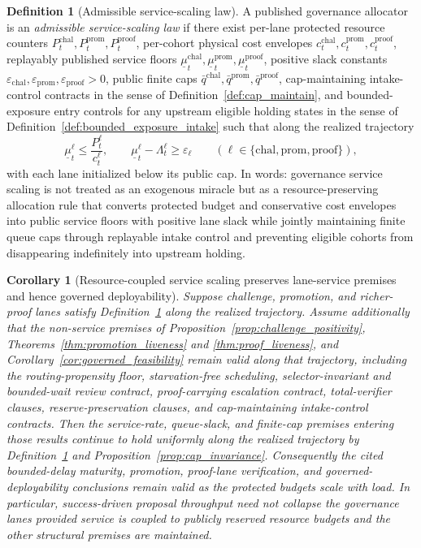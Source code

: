 \documentclass[11pt]{article}
\newtheorem{corollary}[theorem]{Corollary}
\theoremstyle{definition}
\newtheorem{definition}[theorem]{Definition}
\newcommand{\1}{\mathbf{1}}
\newcommand{\eps}{\varepsilon}
\begin{document}
\begin{definition}[Admissible service-scaling law]\label{def:service_scaling}
A published governance allocator is an \emph{admissible service-scaling law} if there exist per-lane protected resource counters $P_t^{\mathrm{chal}},P_t^{\mathrm{prom}},P_t^{\mathrm{proof}}$, per-cohort physical cost envelopes $c_t^{\mathrm{chal}},c_t^{\mathrm{prom}},c_t^{\mathrm{proof}}$, replayably published service floors $\underline\mu_t^{\mathrm{chal}},\underline\mu_t^{\mathrm{prom}},\underline\mu_t^{\mathrm{proof}}$, positive slack constants $\eps_{\mathrm{chal}},\eps_{\mathrm{prom}},\eps_{\mathrm{proof}}>0$, public finite caps $\bar q^{\mathrm{chal}},\bar q^{\mathrm{prom}},\bar q^{\mathrm{proof}}$, cap-maintaining intake-control contracts in the sense of Definition~\ref{def:cap_maintain}, and bounded-exposure entry controls for any upstream eligible holding states in the sense of Definition~\ref{def:bounded_exposure_intake} such that along the realized trajectory
\[
\underline\mu_t^{\ell}\le \frac{P_t^{\ell}}{c_t^{\ell}},\qquad \underline\mu_t^{\ell}-\Lambda_t^{\ell}\ge \eps_{\ell}\qquad (\ell\in\{\mathrm{chal},\mathrm{prom},\mathrm{proof}\}),
\]
with each lane initialized below its public cap. In words: governance service scaling is not treated as an exogenous miracle but as a resource-preserving allocation rule that converts protected budget and conservative cost envelopes into public service floors with positive lane slack while jointly maintaining finite queue caps through replayable intake control and preventing eligible cohorts from disappearing indefinitely into upstream holding.
\end{definition}

\begin{corollary}[Resource-coupled service scaling preserves lane-service premises and hence governed deployability]\label{cor:service_scaling}
Suppose challenge, promotion, and richer-proof lanes satisfy Definition~\ref{def:service_scaling} along the realized trajectory. Assume additionally that the non-service premises of Proposition~\ref{prop:challenge_positivity}, Theorems~\ref{thm:promotion_liveness} and \ref{thm:proof_liveness}, and Corollary~\ref{cor:governed_feasibility} remain valid along that trajectory, including the routing-propensity floor, starvation-free scheduling, selector-invariant and bounded-wait review contract, proof-carrying escalation contract, total-verifier clauses, reserve-preservation clauses, and cap-maintaining intake-control contracts. Then the service-rate, queue-slack, and finite-cap premises entering those results continue to hold uniformly along the realized trajectory by Definition~\ref{def:service_scaling} and Proposition~\ref{prop:cap_invariance}. Consequently the cited bounded-delay maturity, promotion, proof-lane verification, and governed-deployability conclusions remain valid as the protected budgets scale with load. In particular, success-driven proposal throughput need not collapse the governance lanes provided service is coupled to publicly reserved resource budgets and the other structural premises are maintained.
\end{corollary}
\end{document}
